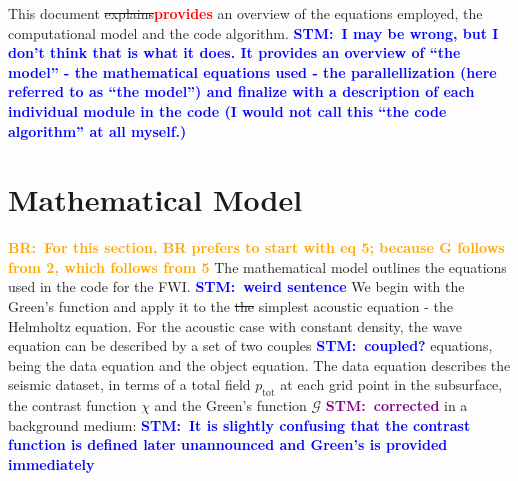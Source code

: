 \documentclass[10pt,a4paper]{article}
\newcommand{\commentstm}[1]{\textcolor{blue}{\textbf{STM:\ #1}}}
\newcommand{\commentstmtwo}[1]{\textcolor{purple}{\textbf{STM:\ #1}}}
\newcommand{\newstm}[1]{\textcolor{red}{\textbf{#1}}}
\newcommand{\oldstm}[1]{\sout{#1}}
\newcommand{\commentbr}[1]{\textcolor{orange}{\textbf{BR:\ #1}}}
\begin{document}

This document \oldstm{explains}\newstm{provides} an overview of the equations employed, the computational model and the code algorithm.
\commentstm{I may be wrong, but I don't think that is what it does. It provides an overview of ``the model'' - the mathematical equations used - the parallellization (here referred to as ``the model'') and finalize with a description of each individual module in the code (I would not call this ``the code algorithm'' at all myself.)}

\section{Mathematical Model}
\commentbr{For this section, BR prefers to start with eq 5; because G follows from 2, which follows from 5}
The mathematical model outlines the equations used in the code for the FWI.
\commentstm{weird sentence}
We begin with the Green's function and apply it to the \oldstm{the} simplest acoustic equation - the Helmholtz equation.
For the acoustic case with constant density, the wave equation can be described by a set of two couples \commentstm{coupled?} equations, being the data equation and the object equation. The data equation describes the seismic dataset, in terms of a total field $p_{\text{tot}}$ at each grid point in the subsurface, the contrast function $\chi$ and the Green's function $\mathcal{G}$ \commentstmtwo{corrected} in a background medium: \commentstm{It is slightly confusing that the contrast function is defined later unannounced and Green's is provided immediately}
\end{document}
